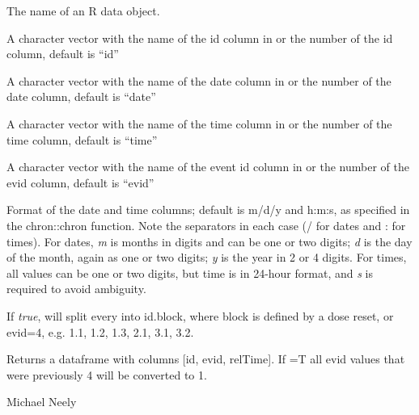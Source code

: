 \documentclass[a4paper]{book}
\begin{document}
\begin{Arguments}
\begin{ldescription}
\item[\code{data}] The name of an R data object.

\item[\code{idCol}] A character vector with the name
of the id column in  or the number of the id column, default is ``id''

\item[\code{dateCol}] A character vector with the name of the date
column in  or the number of the date column, default is ``date''

\item[\code{timeCol}] A character vector with the name of the time
column in  or the number of the time column, default is ``time''

\item[\code{evidCol}] A character vector with the name of the event id
column in  or the number of the evid column, default is ``evid''

\item[\code{format}] Format of the date and time columns; default is
m/d/y and h:m:s, as specified in the chron::chron function.
Note the separators in each case (/ for dates and : for times).
For dates, \emph{m} is months in digits and can be one or two digits;
\emph{d} is the day of the month, again as one or two digits;
\emph{y} is the year in 2 or 4 digits.  For times, all values can be one
or two digits, but time is in 24-hour format, and \emph{s} is required
to avoid ambiguity.

\item[\code{split}] If \emph{true},  will split every 
into id.block, where block is defined by a dose reset, or evid=4,
e.g.  1.1, 1.2, 1.3, 2.1, 3.1, 3.2.
\end{ldescription}
\end{Arguments}
%
\begin{Value}
Returns a dataframe with columns [id, evid, relTime].
If =T all evid values that were previously 4 will be converted to 1.
\end{Value}
%
\begin{Author}\relax
Michael Neely
\end{Author}
%
\begin{SeeAlso}\relax
{}
\end{SeeAlso}
\end{document}
